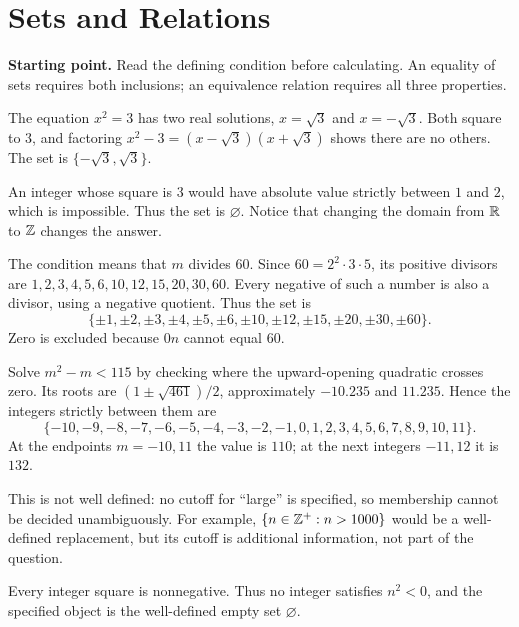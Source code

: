 \section{Sets and Relations}

\textbf{Starting point.} Read the defining condition before calculating. An equality of sets requires both inclusions; an equivalence relation requires all three properties.


The equation $x^2=3$ has two real solutions, $x=\sqrt3$ and $x=-\sqrt3$. Both square to $3$, and factoring $x^2-3=(x-\sqrt3)(x+\sqrt3)$ shows there are no others. The set is $\{-\sqrt3,\sqrt3\}$.


An integer whose square is $3$ would have absolute value strictly between $1$ and $2$, which is impossible. Thus the set is $\varnothing$. Notice that changing the domain from $\mathbb{R}$ to $\mathbb{Z}$ changes the answer.


The condition means that $m$ divides $60$. Since $60=2^2\cdot3\cdot5$, its positive divisors are $1,2,3,4,5,6,10,12,15,20,30,60$. Every negative of such a number is also a divisor, using a negative quotient. Thus the set is
\[\{\pm1,\pm2,\pm3,\pm4,\pm5,\pm6,\pm10,\pm12,\pm15,\pm20,\pm30,\pm60\}.\]
Zero is excluded because $0n$ cannot equal $60$.


Solve $m^2-m<115$ by checking where the upward-opening quadratic crosses zero. Its roots are $(1\pm\sqrt{461})/2$, approximately $-10.235$ and $11.235$. Hence the integers strictly between them are
\[\{-10,-9,-8,-7,-6,-5,-4,-3,-2,-1,0,1,2,3,4,5,6,7,8,9,10,11\}.\]
At the endpoints $m=-10,11$ the value is $110$; at the next integers $-11,12$ it is $132$.


This is not well defined: no cutoff for ``large'' is specified, so membership cannot be decided unambiguously. For example, $\{n\in\mathbb{Z}^+:n>1000\}$ would be a well-defined replacement, but its cutoff is additional information, not part of the question.


Every integer square is nonnegative. Thus no integer satisfies $n^2<0$, and the specified object is the well-defined empty set $\varnothing$.

